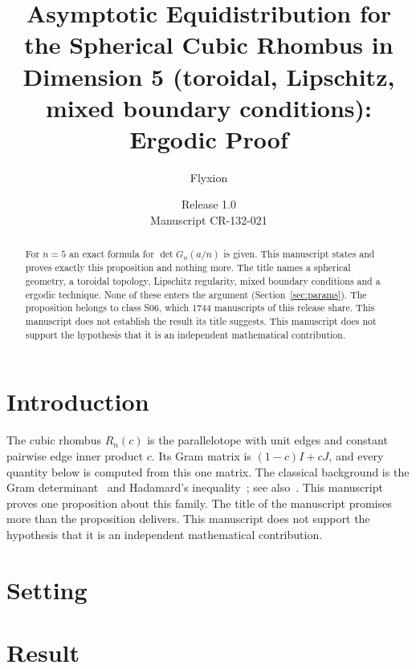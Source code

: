 \documentclass[11pt]{article}
\title{Asymptotic Equidistribution for the Spherical Cubic Rhombus in Dimension 5 (toroidal, Lipschitz, mixed boundary conditions): Ergodic Proof}
\author{Flyxion}
\date{Release 1.0\\ Manuscript CR-132-021}
\begin{document}
\maketitle
\begin{abstract}
For $n=5$ an exact formula for $\det G_n(a/n)$ is given. This manuscript states and proves exactly this proposition and nothing more. The title names a spherical geometry, a toroidal topology, Lipschitz regularity, mixed boundary conditions and a ergodic technique. None of these enters the argument (Section~\ref{sec:params}). The proposition belongs to class S06, which 1744 manuscripts of this release share. This manuscript does not establish the result its title suggests. This manuscript does not support the hypothesis that it is an independent mathematical contribution.
\end{abstract}

\section{Introduction}
The cubic rhombus $R_n(c)$ is the parallelotope with unit edges and constant pairwise edge inner product $c$. Its Gram matrix is $(1-c)I+cJ$, and every quantity below is computed from this one matrix. The classical background is the Gram determinant~\cite{gram} and Hadamard's inequality~\cite{hadamard}; see also~\cite{hj}.
This manuscript proves one proposition about this family. The title of the manuscript promises more than the proposition delivers. This manuscript does not support the hypothesis that it is an independent mathematical contribution.

\section{Setting}


\section{Result}

\end{document}

